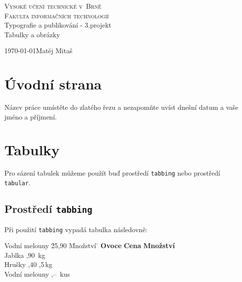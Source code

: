 \documentclass[11pt]{article}
\begin{document}
\begin{titlepage}
	\begin{center}
    	\Huge
		\textsc{\Huge{Vysoké učení technické v~Brně}\\ \huge{Fakulta informačních technologií}} \\
		\LARGE Typografie a publikování - 3.projekt\\
		\Huge{Tabulky a obrázky}
	\end{center}
	{\Large \today \hfill Matěj Mitaš}
\end{titlepage}

%
%

\section{Úvodní strana}
Název práce umístěte do zlatého řezu a nezapomňte uvíst dnešní datum a vaše jméno a
příjmení.

%
%

\section{Tabulky}
	Pro sázení tabulek můžeme použít buď prostředí \texttt{tabbing} nebo prostředí
	\texttt{tabular}.
	
	\subsection{Prostředí \texttt{tabbing}}
	
	Při použití \texttt{tabbing} vypadá tabulka následovně:
    
	\begin{tabbing}

		Vodní melouny \quad \= 25,90 \quad \= Množství \= \kill
		\textbf{Ovoce}\> \textbf{Cena}\> \textbf{Množství}\\
		
		Jablka ,90 \,kg\\
		Hrušky ,40 ,5\,kg\\
		Vodní melouny ,-- \,kus\\
		
	\end{tabbing}
	
\end{document}
